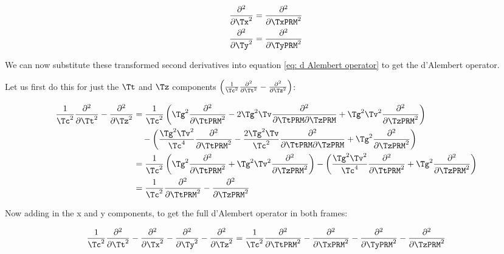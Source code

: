 \begin{derivation}
	\begin{equation}
		\begin{aligned}
			\frac{\partial^2}{\partial \Tx ^2} & = \frac{\partial^2}{\partial \TxPRM ^2} \\
			\frac{\partial^2}{\partial \Ty ^2} & = \frac{\partial^2}{\partial \TyPRM ^2}
		\end{aligned}
	\end{equation}

	We can now substitute these transformed second derivatives into equation \eqref{eq: d Alembert operator} to get the d'Alembert operator.

	Let us first do this for just the $\Tt $ and $\Tz $ components $\left(\frac{1}{\Tc ^2}\frac{\partial^2}{\partial \Tt ^2} - \frac{\partial^2}{\partial \Tz ^2}\right)$:

	\begin{equation}
		\begin{aligned}
			\frac{1}{\Tc ^2}\frac{\partial^2}{\partial \Tt ^2} - \frac{\partial^2}{\partial \Tz ^2}
			 & = \frac{1}{\Tc ^2}\left(\Tg ^2 \frac{\partial^2}{\partial \TtPRM ^2} - 2\Tg ^2 \Tv  \frac{\partial^2}{\partial \TtPRM \partial \TzPRM } + \Tg ^2 \Tv ^2 \frac{\partial^2}{\partial \TzPRM ^2}\right)                                                              \\
			 & \quad - \left(\frac{\Tg ^2 \Tv ^2}{\Tc ^4} \frac{\partial^2}{\partial \TtPRM ^2} - \frac{2\Tg ^2 \Tv }{\Tc ^2} \frac{\partial^2}{\partial \TtPRM \partial \TzPRM } + \Tg ^2 \frac{\partial^2}{\partial \TzPRM ^2}\right)                                             \\
			 & = \frac{1}{\Tc ^2}\left(\Tg ^2 \frac{\partial^2}{\partial \TtPRM ^2} + \Tg ^2 \Tv ^2 \frac{\partial^2}{\partial \TzPRM ^2}\right) - \left(\frac{\Tg ^2 \Tv ^2}{\Tc ^4} \frac{\partial^2}{\partial \TtPRM ^2} + \Tg ^2 \frac{\partial^2}{\partial \TzPRM ^2}\right) \\
			 & = \frac{1}{\Tc ^2} \frac{\partial^2}{\partial \TtPRM ^2} - \frac{\partial^2}{\partial \TzPRM ^2}
		\end{aligned}
	\end{equation}

	Now adding in the x and y components, to get the full d'Alembert operator in both frames:

	\begin{equation}
		\frac{1}{\Tc ^2}\frac{\partial^2}{\partial \Tt ^2} - \frac{\partial^2}{\partial \Tx ^2} - \frac{\partial^2}{\partial \Ty ^2} - \frac{\partial^2}{\partial \Tz ^2} = \frac{1}{\Tc ^2}\frac{\partial^2}{\partial \TtPRM ^2} - \frac{\partial^2}{\partial \TxPRM ^2} - \frac{\partial^2}{\partial \TyPRM ^2} - \frac{\partial^2}{\partial \TzPRM ^2}
	\end{equation}


\end{derivation}
